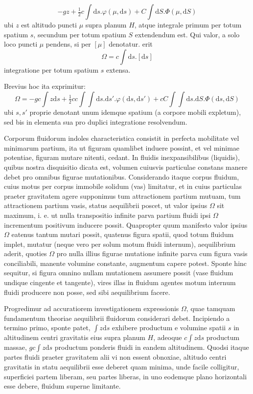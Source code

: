 \[
-gz+\tfrac12c\int\mathrm{d}s.\varphi(\mu,\mathrm{d}s)+C\int\mathrm{d}S.\Phi(\mu,\mathrm{d}S)
\]
ubi $z$ est altitudo puncti $\mu$ supra planum $H$, atque integrale primum per totum spatium $s$, secundum per totum spatium $S$ extendendum est. Qui valor, a solo loco puncti $\mu$ pendens, si per $[\mu]$ denotatur. erit
\[
\Omega=c\int\mathrm{d}s.[\mathrm{d}s]
\]
integratione per totum spatium $s$ extensa.

Brevius hoc ita exprimitur:
\[
\Omega=-gc\int z\mathrm{d}s+\tfrac12cc\int\int\mathrm{d}s.\mathrm{d}s'.\varphi(\mathrm{d}s,\mathrm{d}s')+cC\int\int\mathrm{d}s.\mathrm{d}S.\Phi(\mathrm{d}s,\mathrm{d}S)
\]
ubi $s,s'$ proprie denotant unum idemque spatium (a corpore mobili expletum), sed bis in elementa sua pro duplici integratione resolvendum.

Corporum fluidorum indoles characteristica consistit in perfecta mobilitate vel minimarum partium, ita ut figuram quamlibet induere possint, et vel minimae potentiae, figuram mutare nitenti, cedant. In fluidis inexpansibilibus (liquidis), quibus nostra disquisitio dicata est, volumen cuiusvis particulae constans manere debet pro omnibus figurae mutationibus. Considerando itaque corpus fluidum, cuius motus per corpus immobile solidum (vas) limitatur, et in cuius particulas praeter gravitatem agere supponimus tum attractionem partium mutuam, tum attractionem partium vasis, status aequilibrii poscet, ut valor ipsius $\Omega$ sit maximum, i. e. ut nulla transpositio infinite parva partium fluidi ipsi $\Omega$ incrementum positivum inducere possit. Quapropter quum manifesto valor ipsius $\Omega$ eatenus tantum mutari possit, quatenus figura spatii, quod totum fluidum implet, mutatur (neque vero per solum motum fluidi internum), aequilibrium aderit, quoties $\Omega$ pro nulla illius figurae mutatione infinite parva cum figura vasis conciliabili, manente volumine constante, augmentum capere potest. Sponte hinc sequitur, si figura omnino nullam mutationem assumere possit (vase fluidum undique cingente et tangente), vires illas in fluidum agentes motum internum fluidi producere non posse, sed sibi aequilibrium facere.

Progredimur ad accuratiorem investigationem expressionis $\Omega$, quae tamquam fundamentum theoriae aequilibrii fluidorum considerari debet. Incipiendo a termino primo, sponte patet, $\int z\mathrm{d}s$ exhibere productum e volumine spatii $s$ in altitudinem centri gravitatis eius supra planum $H$, adeoque $c\int z\mathrm{d}s$ productum massae, $gc\int z\mathrm{d}s$ productum ponderis fluidi in eandem altitudinem. Quodsi itaque partes fluidi praeter gravitatem alii vi non essent obnoxiae, altitudo centri gravitatis in statu aequilibrii esse deberet quam minima, unde facile colligitur, superficiei partem liberam, seu partes liberas, in uno eodemque plano horizontali esse debere, fluidum superne limitante.

